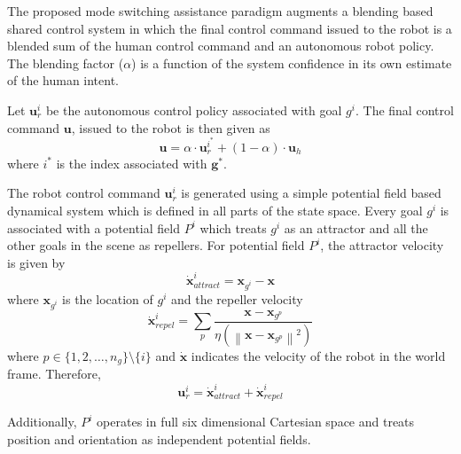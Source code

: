 \documentclass[conference]{IEEEtran}
\newcommand{\norm}[1]{\left\lVert#1\right\rVert}
\begin{document}
The proposed mode switching assistance paradigm augments a blending based shared control system in which the final control command issued to the robot is a blended sum of the human control command and an autonomous robot policy. The blending factor ($\alpha$) is a function of the system confidence in its own estimate of the human intent. 

Let $\boldsymbol{u}_{r}^{i}$ be the autonomous control policy associated with goal $g^i$. The final control command $\boldsymbol{u}$, issued to the robot is then given as 
\begin{equation*}
\boldsymbol{u} = \alpha\cdot \boldsymbol{u}_r^{i^*} + (1 - \alpha)\cdot \boldsymbol{u}_h
\end{equation*}
where $i^{*}$ is the index associated with $\boldsymbol{g}^{*}$.



The robot control command $\boldsymbol{u}_r^{i}$ is generated using a simple potential field based dynamical system which is defined in all parts of the state space. Every goal $g^i$ is associated with a potential field $P^{i}$ which treats $g^i$ as an attractor and all the other goals in the scene as repellers. For potential field $P^i$, the attractor velocity is given by
\begin{equation*}
\dot{\boldsymbol{x}}^i_{attract} = \boldsymbol{x}_{g^i} - \boldsymbol{x}
\end{equation*}
where $\boldsymbol{x}_{g^i}$ is the location of $g^i$ and the repeller velocity
\begin{equation*}
\dot{\boldsymbol{x}}^i_{repel} = \sum_{p} \frac{\boldsymbol{x} - \boldsymbol{x}_{g^p}}{\eta(\norm{\boldsymbol{x} - \boldsymbol{x}_{g^p}}^2)}
\end{equation*}
where $p \in \{1,2,\dots,n_g\} \setminus \{i\}$ and $\dot{\boldsymbol{x}}$ indicates the velocity of the robot in the world frame.  Therefore, 
\begin{equation*}
\boldsymbol{u}_{r}^i = \dot{\boldsymbol{x}}^i_{attract} + \dot{\boldsymbol{x}}^i_{repel} 
\end{equation*}

Additionally, $P^i$ operates in full six dimensional Cartesian space and treats position and orientation as independent potential fields. 
\end{document}
